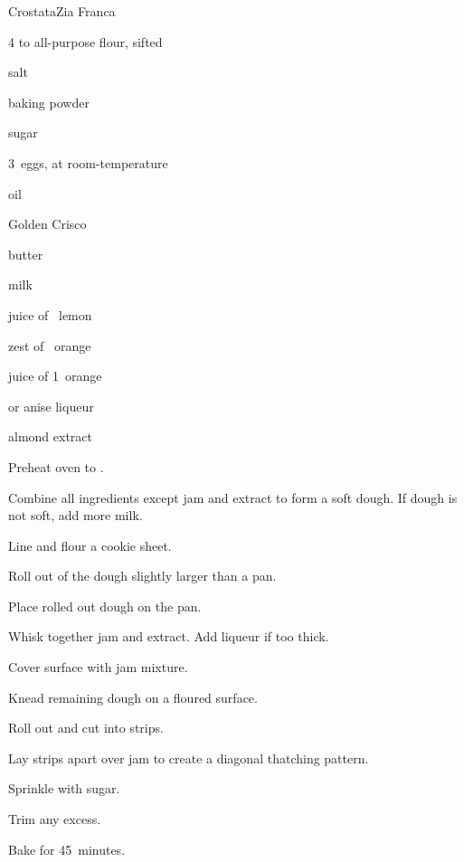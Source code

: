 \begin{recipe}{Crostata}{Zia Franca}{}

\begin{ingredients}
\item 4\half{} to  all-purpose flour, sifted
\item \tp{\quarter} salt
\item \Tp{1\half} baking powder
\item {} sugar
\item 3~eggs, at room-temperature
\item \C{\half} oil
\item \C{\quarter} Golden Crisco
\item \C{\quarter} butter
\item \C{\half} milk
\item juice of \half~lemon
\item zest of \half~orange
\item juice of 1~orange
\item {}  or anise liqueur
\item {} 
\item \tp{\half} almond extract
\end{ingredients}

\begin{directions}
\item Preheat oven to .
\item Combine all ingredients except jam and extract to form a soft dough. If dough is not soft, add more milk.
\item Line and flour a cookie sheet.
\item Roll out \twothird{} of the dough slightly larger than a pan.
\item Place rolled out dough on the pan.
\item Whisk together jam and extract. Add liqueur if too thick.
\item Cover surface with jam mixture.
\item Knead remaining dough on a floured surface.
\item Roll out and cut into \inch{\half} strips.
\item Lay strips  apart over jam to create a diagonal thatching pattern.
\item Sprinkle with sugar.
\item Trim any excess.
\item Bake for 45~minutes.
\end{directions}

\end{recipe}
